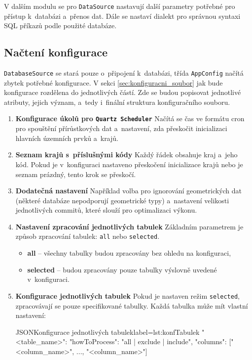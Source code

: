 V dalším modulu se pro \texttt{DataSource} nastavují další parametry potřebné pro přístup k~databázi a~přenos dat.  
Dále se nastaví dialekt pro správnou syntaxi SQL příkazů podle použité databáze.

\subsection{Načtení konfigurace}
\label{sec:konfigurace}
\texttt{DatabaseSource} se stará pouze o~připojení k~databázi,  
třída \texttt{AppConfig} načítá zbytek potřebné konfigurace.
V sekci \ref{sec:konfiguracni_soubor} jak bude konfigurace rozdělena do jednotlivých částí.
Zde se budou popisovat jednotlivé atributy, jejich význam, a~tedy i~finální struktura konfiguračního souboru.
\begin{enumerate}
    \item \textbf{Konfigurace úkolů pro \texttt{Quartz Scheduler}}  
    Načítá se čas ve formátu cron pro spouštění přírůstkových dat  
    a~nastavení, zda přeskočit inicializaci hlavních územních prvků a~krajů.
    \item \textbf{Seznam krajů s~příslušnými kódy}  
    Každý řádek obsahuje kraj a~jeho kód.  
    Pokud je v~konfiguraci nastaveno přeskočení inicializace krajů nebo je seznam prázdný, tento krok se přeskočí.
    \item \textbf{Dodatečná nastavení}  
    Například volba pro ignorování geometrických dat  
    (některé databáze nepodporují geometrické typy)  
    a~nastavení velikosti jednotlivých commitů, které slouží pro optimalizaci výkonu.
    \item \textbf{Nastavení zpracování jednotlivých tabulek}
    Základním parametrem je způsob zpracování tabulek: \texttt{all} nebo \texttt{selected}.  
    \begin{itemize}
        \item \textbf{all} -- všechny tabulky budou zpracovány bez ohledu na konfiguraci,
        \item \textbf{selected} -- budou zpracovány pouze tabulky výslovně uvedené v~konfiguraci.
    \end{itemize}
    \item \textbf{Konfigurace jednotlivých tabulek}  
    Pokud je nastaven režim \texttt{selected}, zpracovávají se pouze specifikované tabulky.  
    Každá tabulka může mít vlastní nastavení:
    \begin{code}{JSON}{Konfigurace jednotlivých tabulek}{label=lst:konfTabulek}
        "<table_name>": {
            "howToProcess": "all | exclude | include",
            "columns": ["<column_name>", ..., "<column_name>"]
        }
    \end{code}
    

\end{enumerate}
